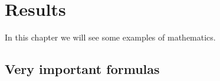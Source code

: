 \chapter{Results}
In this chapter we will see some examples of mathematics.

\section{Very important formulas}
